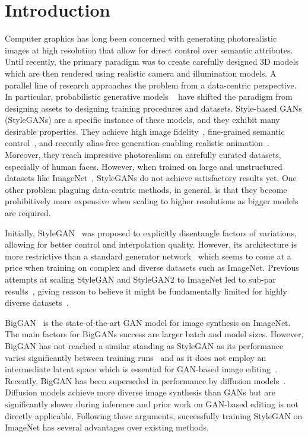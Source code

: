 \section{Introduction}
\label{sec:intro}

Computer graphics has long been concerned with generating photorealistic images at high resolution that allow for direct control over semantic attributes. Until recently, the primary paradigm was to create carefully designed 3D models which are then rendered using realistic camera and illumination models. A parallel line of research approaches the problem from a data-centric perspective. 
In particular, probabilistic generative models ~\cite{Goodfellow2014NEURIPS,Oord2017NEURIPS,Song2021ICLR} have shifted the paradigm from designing assets to designing training procedures and datasets. Style-based GANs (StyleGANs) are a specific instance of these models, and they exhibit many desirable properties. They achieve high image fidelity~\cite{Karras2019CVPR, Karras2020CVPR}, fine-grained semantic control~\cite{Haerkoenen2020NEURIPS, WU2021CVPRa,Ling2021ARXIV}, and recently alias-free generation enabling realistic animation~\cite{Karras2021NEURIPS}. Moreover, they reach impressive photorealism on carefully curated datasets, especially of human faces. However, when trained on large and unstructured datasets like ImageNet~\cite{Deng2009CVPR}, StyleGANs do not achieve satisfactory results yet. One other problem plaguing data-centric methods, in general, is that they become prohibitively more expensive when scaling to higher resolutions as bigger models are required.

Initially, StyleGAN~\cite{Karras2019CVPR} was proposed to explicitly disentangle factors of variations, allowing for better control and interpolation quality. 
However, its architecture is more restrictive than a standard generator network~\cite{Radford2016ICLR, Karras2018ICLR} which seems to come at a price when training on complex and diverse datasets such as ImageNet. Previous attempts at scaling StyleGAN and StyleGAN2 to ImageNet led to sub-par results~\cite{Gwern2020MISC, Grigoryev2022ICLR},  giving reason to believe it might be fundamentally limited for highly diverse datasets~\cite{Gwern2020MISC}.

BigGAN~\cite{Brock2019ICLR} is the state-of-the-art GAN model for image synthesis on ImageNet. The main factors for BigGANs success are larger batch and model sizes.
However, BigGAN has not reached a similar standing as StyleGAN as its performance varies significantly between training runs~\cite{Karras2020NeurIPS} and as it does not employ an intermediate latent space which is essential for GAN-based image editing~\cite{Abdal2021TOG, Patashnik2021ICCV, Collins2020CVPR, WU2021CVPRa}. Recently, BigGAN has been superseded in performance by diffusion models~\cite{Dhariwal2021NEURIPS}. Diffusion models achieve more diverse image synthesis than GANs but are significantly slower during inference and prior work on GAN-based editing is not directly applicable. Following these arguments, successfully training StyleGAN on ImageNet has several advantages over existing methods.

